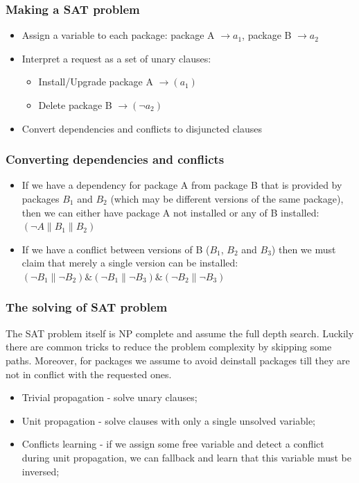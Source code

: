 \documentclass{beamer}
\begin{document}
\begin{frame}
\frametitle{Making a SAT problem}
\begin{itemize}
  \item Assign a variable to each package: 
  package A $\to a_1$, package B $\to a_2$
  \item Interpret a request as a set of unary clauses:
  \begin{itemize}
    \item Install/Upgrade package A $\to (a_1)$
    \item Delete package B $\to (\neg a_2)$
  \end{itemize}
  \item Convert dependencies and conflicts to disjuncted clauses
\end{itemize}

\end{frame}

\begin{frame}
\frametitle{Converting dependencies and conflicts}
\begin{itemize}
  \item If we have a dependency for package A from package B that is provided by
packages $B_1$ and $B_2$ (which may be different versions of the same package),
then we can either have package A not installed or any of B installed:
  \bigskip
$(\neg A \| B_1 \| B_2)$
  \item If we have a conflict between versions of B ($B_1$, $B_2$ and $B_3$)
 then we must claim that merely a single version can be installed:
  \bigskip
$(\neg B_1 \| \neg B_2) \& (\neg B_1 \| \neg B_3) \& (\neg B_2 \| \neg
B_3)$
\end{itemize}
\end{frame}

\begin{frame}
\frametitle{The solving of SAT problem}

The SAT problem itself is NP complete and assume the full depth search. Luckily
there are common tricks to reduce the problem complexity by skipping some paths.
Moreover, for packages we assume to avoid deinstall packages till they are not
in conflict with the requested ones.
\begin{itemize}
  \item Trivial propagation - solve unary clauses;
  \item Unit propagation - solve clauses with only a single unsolved variable;
  \item Conflicts learning - if we assign some free variable and detect a
  conflict during unit propagation, we can fallback and learn that this variable
  must be inversed;
\end{itemize}
\end{frame}
\end{document}
